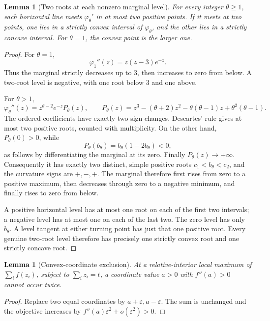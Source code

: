 \documentclass[11pt]{article}
\newtheorem{lemma}[theorem]{Lemma}
\theoremstyle{remark}\newtheorem{remark}[theorem]{Remark}
\begin{document}
\begin{lemma}[Two roots at each nonzero marginal level]\label{lem:roots}
For every integer \(\theta\ge1\), each horizontal line meets
\(\varphi_\theta'\) in at most two positive points. If it meets at two points,
one lies in a strictly convex interval of \(\varphi_\theta\), and the other lies in a strictly concave interval. For \(\theta=1\), the convex point is the larger one.
\end{lemma}
\begin{proof}
For \(\theta=1\),
\[
\varphi_1''(z)=z(z-3)e^{-z}.
\]
Thus the marginal strictly decreases up to \(3\), then increases to zero from below. A two-root level is negative, with one root below \(3\) and one above.

For \(\theta>1\),
\[
\varphi_\theta''(z)=z^{\theta-2}e^{-z}P_\theta(z),\qquad
P_\theta(z)=z^3-(\theta+2)z^2-\theta(\theta-1)z+\theta^2(\theta-1).
\]
The ordered coefficients have exactly two sign changes. Descartes' rule gives at most two positive roots, counted with multiplicity. On the other hand,
\(P_\theta(0)>0\), while
\[
P_\theta(b_\theta)=b_\theta(1-2b_\theta)<0,
\]
as follows by differentiating the marginal at its zero. Finally \(P_\theta(z)\to+\infty\). Consequently it has exactly two distinct, simple positive roots
\(c_1<b_\theta<c_2\), and the curvature signs are \(+,-,+\).
The marginal therefore first rises from zero to a positive maximum, then decreases through zero to a negative minimum, and finally rises to zero from below.

A positive horizontal level has at most one root on each of the first two intervals; a negative level has at most one on each of the last two. The zero level has only \(b_\theta\). A level tangent at either turning point has just that one positive root. Every genuine two-root level therefore has precisely one strictly convex root and one strictly concave root.
\end{proof}

\begin{lemma}[Convex-coordinate exclusion]\label{lem:repeat}
At a relative-interior local maximum of \(\sum_i f(z_i)\), subject to
\(\sum_i z_i=t\), a coordinate value \(a>0\) with \(f''(a)>0\) cannot occur twice.
\end{lemma}
\begin{proof}
Replace two equal coordinates by \(a+\varepsilon,a-\varepsilon\). The sum is unchanged and the objective increases by
\(f''(a)\varepsilon^2+o(\varepsilon^2)>0\).
\end{proof}
\end{document}
